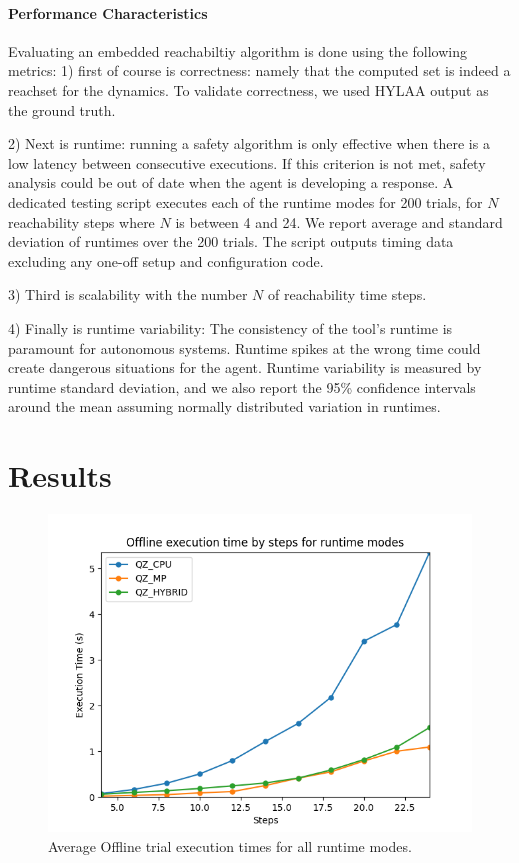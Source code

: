 \documentclass[runningheads]{llncs}
\begin{document}
\paragraph{Performance Characteristics}
Evaluating an embedded reachabiltiy algorithm is done using the following metrics: 
1) first of course is correctness: namely that the computed set is indeed a reachset for the dynamics. To validate correctness, we used HYLAA output as the ground truth.

2) Next is runtime: running a safety algorithm is only effective when there is a low latency between consecutive executions. If this criterion is not met, safety analysis could be out of date when the agent is developing a response.
A dedicated testing script executes each of the runtime modes for 200 trials, for $N$ reachability steps where $N$ is between 4 and 24. 
We report average and standard deviation of runtimes over the 200 trials.
The script outputs timing data excluding any one-off setup and configuration code.

3) Third is scalability with the number $N$ of reachability time steps. 

4) Finally is runtime variability: The consistency of the tool's runtime is paramount for autonomous systems. 
Runtime spikes at the wrong time could create dangerous situations for the agent. 
Runtime variability is measured by runtime standard deviation, and we also report the  95\% confidence intervals around the mean assuming normally distributed variation in runtimes.


\section{Results}

\begin{figure}[t]
\includegraphics[width=.5\textwidth]{profiler_out/offline_avg_unified.png}
\caption{Average Offline trial execution times for all runtime modes.} \label{offline_avg}
\end{figure}
\end{document}
